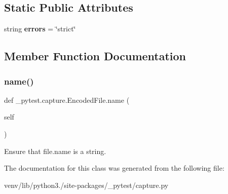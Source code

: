\subsection*{Static Public Attributes}
\begin{DoxyCompactItemize}
\item 
\mbox{\label{class__pytest_1_1capture_1_1_encoded_file_a3a287829b314a51a240c771b85285cc7}} 
string {\bfseries errors} = \char`\"{}strict\char`\"{}
\end{DoxyCompactItemize}


\subsection{Member Function Documentation}
\mbox{\label{class__pytest_1_1capture_1_1_encoded_file_aa0a199ed5c643fa5783b598bf9cb264d}} 
\subsubsection{\texorpdfstring{name()}{name()}}
{\footnotesize\ttfamily def \+\_\+pytest.\+capture.\+Encoded\+File.\+name (\begin{DoxyParamCaption}\item[{}]{self }\end{DoxyParamCaption})}

\begin{DoxyVerb}Ensure that file.name is a string.\end{DoxyVerb}
 

The documentation for this class was generated from the following file\+:\begin{DoxyCompactItemize}
\item 
venv/lib/python3./site-\/packages/\+\_\+pytest/capture.\+py\end{DoxyCompactItemize}
